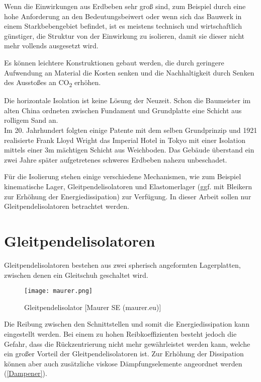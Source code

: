 Wenn die Einwirkungen aus Erdbeben sehr groß sind, zum Beispiel durch eine hohe Anforderung an den Bedeutungsbeiwert oder wenn sich das Bauwerk in einem Starkbebengebiet befindet, ist es meistens technisch und wirtschaftlich günstiger, die Struktur von der Einwirkung zu isolieren, damit sie dieser nicht mehr vollends ausgesetzt wird.

Es können leichtere Konstruktionen gebaut werden, die durch geringere Aufwendung an Material die Kosten senken und die Nachhaltigkeit durch Senken des Ausstoßes an CO\textsubscript{2} erhöhen.

Die horizontale Isolation ist keine Lösung der Neuzeit. Schon die Baumeister im alten China ordneten zwischen Fundament und Grundplatte eine Schicht aus rolligem Sand an. \cite{Taylor}\\
Im 20. Jahrhundert folgten einige Patente mit dem selben Grundprinzip und 1921 realisierte Frank Lloyd Wright das Imperial Hotel in Tokyo mit einer Isolation mittels einer 3m mächtigen Schicht aus Weichboden. Das Gebäude überstand ein zwei Jahre später aufgetretenes schweres Erdbeben nahezu unbeschadet. \cite{Reitherman}

Für die Isolierung stehen einige verschiedene Mechanismen, wie zum Beispiel kinematische Lager, Gleitpendelisolatoren und Elastomerlager (ggf. mit Bleikern zur Erhöhung der Energiedissipation) zur Verfügung.
In dieser Arbeit sollen nur Gleitpendelisolatoren betrachtet werden.

\pagebreak

\section{Gleitpendelisolatoren}
\label{sec:gleitisolatoren}

 Gleitpendelisolatoren bestehen aus zwei spherisch angeformten Lagerplatten, zwischen denen ein Gleitschuh geschaltet wird.

\begin{figure}[H]
    \centering
    \texttt{[image: maurer.png]}
    \caption{Gleitpendelisolator [Maurer SE (maurer.eu)]}
\end{figure}

Die Reibung zwischen den Schnittstellen und somit die Energiedissipation kann eingestellt werden.
Bei einem zu hohen Reibkoeffizienten besteht jedoch die Gefahr, dass die Rückzentrierung nicht mehr gewährleistet werden kann, welche ein großer Vorteil der Gleitpendelisolatoren ist.
Zur Erhöhung der Dissipation können aber auch zusätzliche viskose Dämpfungselemente angeordnet werden (\cref{Dampener}).

